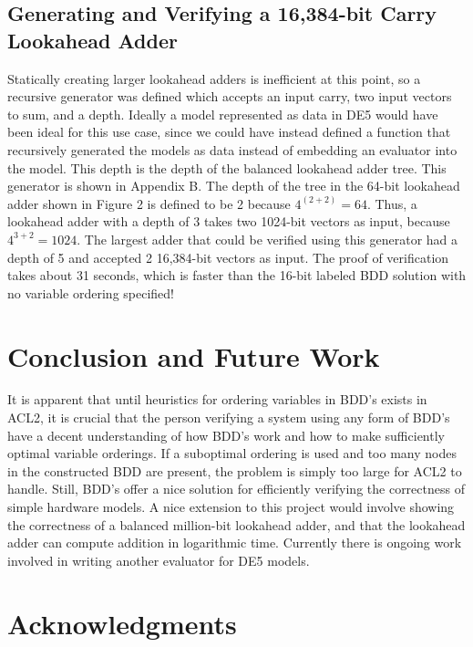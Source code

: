\documentclass[fleqn,10pt]{SelfArx} %
\begin{document}
\subsection{Generating and Verifying a 16,384-bit Carry \\Lookahead Adder}

Statically creating larger lookahead adders is inefficient at this point, so a recursive generator was defined which accepts an input carry, two input vectors to sum, and a depth. Ideally a model represented as data in DE5 would have been ideal for this use case, since we could have instead defined a function that recursively generated the models as data instead of embedding an evaluator into the model\cite{DE2}. This depth is the depth of the balanced lookahead adder tree. This generator is shown in Appendix B. The depth of the tree in the 64-bit lookahead adder shown in Figure 2 is defined to be 2 because $4^(2+2)=64$. Thus, a lookahead adder with a depth of 3 takes two 1024-bit vectors as input, because $4^{3+2}=1024$. The largest adder that could be verified using this generator had a depth of 5 and accepted 2 16,384-bit vectors as input. The proof of verification takes about 31 seconds, which is faster than the 16-bit labeled BDD solution with no variable ordering specified!

\section{Conclusion and Future Work}

It is apparent that until heuristics for ordering variables in BDD's exists in ACL2, it is crucial that the person verifying a system using any form of BDD's have a decent understanding of how BDD's work and how to make sufficiently optimal variable orderings. If a suboptimal ordering is used and too many nodes in the constructed BDD are present, the problem is simply too large for ACL2 to handle. Still, BDD's offer a nice solution for efficiently verifying the correctness of simple hardware models. A nice extension to this project would involve showing the correctness of a balanced million-bit lookahead adder, and that the lookahead adder can compute addition in logarithmic time. Currently there is ongoing work involved in writing another evaluator for DE5 models. 


\section*{Acknowledgments} %
\end{document}
